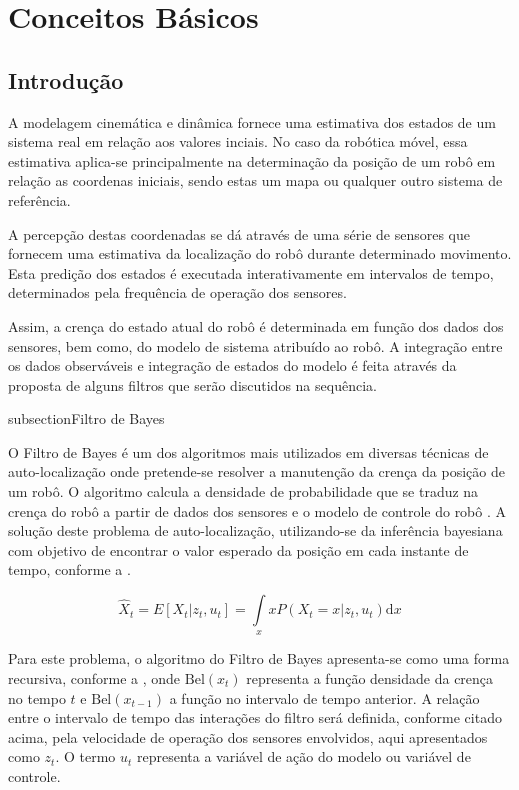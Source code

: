 \chapter{Conceitos Básicos}

\section{Introdução}\label{intro::cap3}

A modelagem cinemática e dinâmica fornece uma estimativa dos estados de um sistema real em relação aos valores inciais. No caso da robótica móvel, essa estimativa aplica-se principalmente na determinação da posição de um robô em relação as coordenas iniciais, sendo estas um mapa ou qualquer outro sistema de referência.

A percepção destas coordenadas se dá através de uma série de sensores que fornecem uma estimativa da localização do robô durante determinado movimento. Esta predição dos estados é executada interativamente em intervalos de tempo, determinados pela frequência de operação dos sensores. 

Assim, a crença do estado atual do robô é determinada em função dos dados dos sensores, bem como, do modelo de sistema atribuído ao robô. A integração entre os dados observáveis e integração de estados do modelo é feita através da proposta de alguns filtros que serão discutidos na sequência. 

subsection{Filtro de Bayes}

O Filtro de Bayes é um dos algoritmos mais utilizados em diversas técnicas de auto-localização onde pretende-se resolver a manutenção da crença da posição de um robô. O algoritmo calcula a densidade de probabilidade que se traduz na crença do robô a partir de dados dos sensores e o modelo de controle do robô  \cite{thrun2006probalistic}. A solução deste problema de auto-localização, utilizando-se da inferência bayesiana com objetivo de encontrar o valor esperado da posição em cada instante de tempo, conforme a .

\begin{equation}
    \label{eq:bayes1}
    \hat X_t = E\left[X_t| z_t, u_t\right] = \displaystyle \int\limits_x x P(X_t = x| z_t, u_t)\text{d}x
\end{equation}

Para este problema, o algoritmo do Filtro de Bayes apresenta-se como uma forma recursiva, conforme a , onde $\text{Bel}(x_t)$ representa a função densidade da crença no tempo $t$ e $\text{Bel}(x_{t-1})$ a função no intervalo de tempo anterior. A relação entre o intervalo de tempo das interações do filtro será definida, conforme citado acima, pela velocidade de operação dos sensores envolvidos, aqui apresentados como $z_t$. O termo $u_t$ representa a variável de ação do modelo ou variável de controle.


